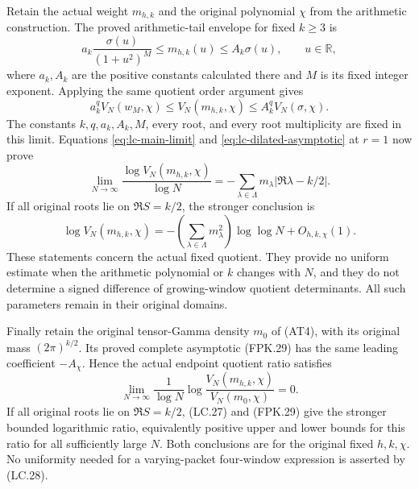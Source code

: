 Retain the actual weight $m_{h,k}$ and the original polynomial $\chi$ from
the arithmetic construction. The proved arithmetic-tail envelope for fixed
$k\ge3$ is
\[
 a_k\frac{\sigma(u)}{(1+u^2)^M}
 \le m_{h,k}(u)\le A_k\sigma(u),
 \qquad u\in\mathbb R,
 \tag{LC.24}\label{eq:lc-arithmetic-envelope}
\]
where $a_k,A_k$ are the positive constants calculated there and $M$ is its
fixed integer exponent. Applying the same quotient order argument gives
\[
 a_k^qV_N(w_M,\chi)
 \le V_N(m_{h,k},\chi)\le A_k^qV_N(\sigma,\chi).
 \tag{LC.25}\label{eq:lc-arithmetic-sandwich}
\]
The constants $k,q,a_k,A_k,M$, every root, and every root multiplicity are
fixed in this limit. Equations \eqref{eq:lc-main-limit} and
\eqref{eq:lc-dilated-asymptotic} at $r=1$ now prove
\[
 \boxed{\displaystyle
 \lim_{N\to\infty}\frac{\log V_N(m_{h,k},\chi)}{\log N}
 =-\sum_{\lambda\in\Lambda}m_\lambda|\Re\lambda-k/2|.}
 \tag{LC.26}\label{eq:lc-actual-limit}
\]
If all original roots lie on $\Re S=k/2$, the stronger conclusion is
\[
 \log V_N(m_{h,k},\chi)
 =-\left(\sum_{\lambda\in\Lambda}m_\lambda^2\right)
 \log\log N+O_{h,k,\chi}(1).
 \tag{LC.27}\label{eq:lc-actual-critical-law}
\]
These statements concern the actual fixed quotient. They provide no
uniform estimate when the arithmetic polynomial or $k$ changes with $N$,
and they do not determine a signed difference of growing-window quotient
determinants. All such parameters remain in their original domains.

Finally retain the original tensor-Gamma density $m_0$ of (AT4),
with its original mass $(2\pi)^{k/2}$. Its proved complete asymptotic
(FPK.29) has the same leading coefficient $-A_\chi$. Hence the
actual endpoint quotient ratio satisfies
\[
 \lim_{N\to\infty}\frac{1}{\log N}
       \log\frac{V_N(m_{h,k},\chi)}{V_N(m_0,\chi)}=0.
 \tag{LC.28}\label{eq:lc-original-reference-ratio}
\]
If all original roots lie on $\Re S=k/2$, (LC.27) and (FPK.29)
give the stronger bounded logarithmic ratio, equivalently positive
upper and lower bounds for this ratio for all sufficiently large $N$.
Both conclusions are for the original fixed $h,k,\chi$. No
uniformity needed for a varying-packet four-window expression is
asserted by (LC.28).
